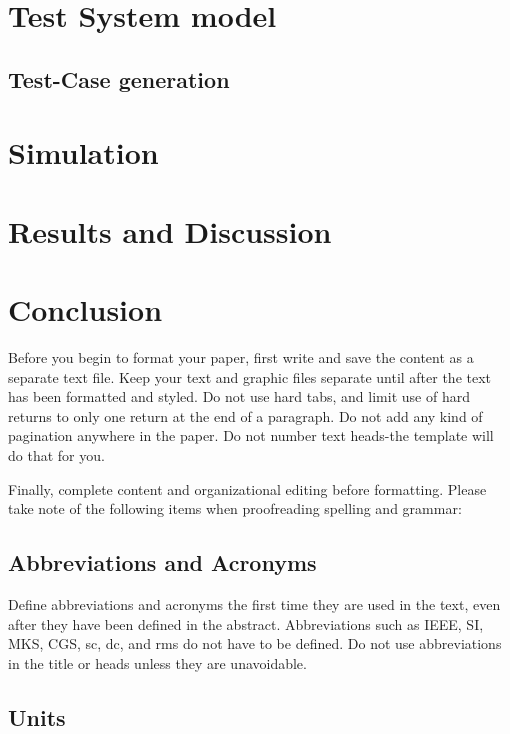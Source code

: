 \documentclass[a4paper, 10pt, conference]{ieeeconf}      %
\begin{document}
\section{Test System model}

\subsection{Test-Case generation}
\section{Simulation }
\section{Results and Discussion}
\section{Conclusion}

Before you begin to format your paper, first write and save the content as a separate text file. Keep your text and graphic files separate until after the text has been formatted and styled. Do not use hard tabs, and limit use of hard returns to only one return at the end of a paragraph. Do not add any kind of pagination anywhere in the paper. Do not number text heads-the template will do that for you.

Finally, complete content and organizational editing before formatting. Please take note of the following items when proofreading spelling and grammar:

\subsection{Abbreviations and Acronyms} Define abbreviations and acronyms the first time they are used in the text, even after they have been defined in the abstract. Abbreviations such as IEEE, SI, MKS, CGS, sc, dc, and rms do not have to be defined. Do not use abbreviations in the title or heads unless they are unavoidable.

\subsection{Units}
\end{document}
